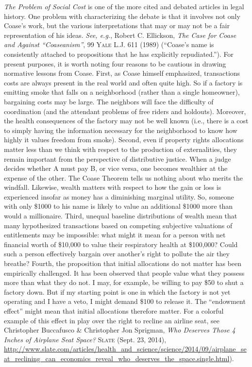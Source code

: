 \textit{The Problem of Social Cost} is one of the more cited and debated
articles in legal history. One problem with characterizing the debate is that it
involves not only Coase's work, but the various interpretations that may or may
not be a fair representation of his ideas. \textit{See, e.g.}, Robert C.
Ellickson, \textit{The Case for Coase and Against ``Coaseanism''}, 99
\textsc{Yale L.J}. 611 (1989) (``Coase's name is consistently attached to
propositions that he has explicitly repudiated.''). For present purposes, it is
worth noting four reasons to be cautious in drawing normative lessons from
Coase. First, as Coase himself emphasized, transactions costs are always present
in the real world and often quite high. So if a factory is emitting smoke that
falls on a neighborhood (rather than a single homeowner), bargaining costs may
be large. The neighbors will face the difficulty of coordination (and the
attendant problems of free riders and holdouts). Moreover, the health
consequences of the factory may not be well known (i.e., there is a cost to
simply having the information necessary for the neighborhood to know how highly
it values freedom from smoke). Second, even if property rights allocations
matter less than we think with respect to the production of externalities, they
remain important from the perspective of distributive justice. When a judge
decides whether A must pay B, or vice versa, one becomes wealthier at the
expense of the other. The Coase Theorem tells us nothing about who merits the
windfall. Likewise, wealth matters with respect to how the gain or loss is
experienced insofar as money has a diminishing marginal utility. So, someone
with only \$1000 to his name is likely to value an additional \$1000 more than
would a millionaire. Third, unequal baseline distributions of wealth mean that
many hypothesized transactions based on competing subjective valuations of
entitlements may be impossible: what might it mean for a person with net
financial worth of \$10,000 to value their respiratory health at \$100,000?
Could such a person effectively bargain over another's right to pollute the air
they breathe? Fourth, the proposition that initial allocations do not matter has
been empirically challenged. It has been observed that people value what they
possess more than what they do not. I may, for example, be willing to pay \$50
to shut a factory down. But if my starting point is one in which the factory is
not yet operating and I have a veto, I might demand \$100 to release it. The
``endowment effect'' might mean that initial allocations therefore matter. For a
colorful example of this effect in play over the right to recline an airline
seat, see Christopher Buccafusco \& Christopher Jon Sprigman, \textit{Who
Deserves Those 4 Inches of Airplane Seat Space?} \textsc{Slate} (Sept. 23,
2014),
\url{http://www.slate.com/articles/health_and_science/science/2014/09/airplane_seat_reclining_can_economics_reveal_who_deserves_the_space.single.html}).

